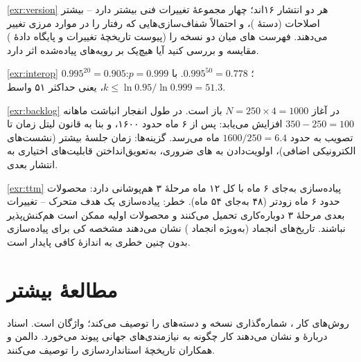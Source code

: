 \documentclass[11pt,a4paper]{article}
\begin{document}
\begin{solutionbox}{\ref{exr:version}}
هر دو انتشار ۱۶اند؛  چهار مجموعهٔ تغییرات فنی بیشتر دارد -- بیشتر اصلاحات (دستهٔ )، و احتمالاً شفاف‌سازی‌هایی
که رفتار را در موارد مرزی تغییر می‌دهند. فهرست های میان دو نسخه را (پیوست تاریخچهٔ تغییرات و پایگاه دادهٔ )
مقایسه و بررسی کنید آیا هیچ‌یک بر رویه‌های پیاده‌شده اثر دارد.
\end{solutionbox}

\begin{solutionbox}{\ref{exr:interop}}
$0.995^{20} = 0.905$؛ $0.995^{50} = 0.778$. با $p = 0.999$: $k \le \ln 0.95/\ln 0.999 = 51.3$، یعنی حداکثر ۵۱ واسط.
\end{solutionbox}

\begin{solutionbox}{\ref{exr:backlog}}
در آغاز $N = 250\times4 = 1000$  باز است. در طول انفجار انباشت ماهانه $350 - 250 = 100$ افزایش می‌یابد: پس از ۶ ماه
حدود ۱۶۰۰، و بنا به قانون لیتل زمان تا تصویب به حدود $1600/250 = 6.4$ ماه می‌رسد. گزینه‌ها: زمان جلسهٔ بیشتر (نشست‌های
الکترونیکی اضافی)، اولویت‌دادن به های ضروری، به‌تعویق‌انداختن قابلیت‌های اختیاری به انتشار بعدی.
\end{solutionbox}

\begin{solutionbox}{\ref{exr:ttm}}
پیاده‌سازی به‌جای ۶ ماه با کل ۱۲ ماه مرحلهٔ ۳ هم‌پوشانی دارد: محصولات حدود ۶ ماه زودتر (۴۸ به‌جای ۵۴ ماه). خطر: پیاده‌سازی
یک هدف متحرک -- تغییرات بعدی مرحلهٔ ۳ دوباره‌کاری تحمیل می‌کنند و محصولات اولیه ممکن است هم‌کنش‌پذیر نباشند. تاریخ‌های
انجماد (به‌ویژه انجماد ) نشان می‌دهند مشخصه کی برای پیاده‌سازی بدون چنین خطری به اندازهٔ کافی پایدار است.
\end{solutionbox}

\section{مطالعهٔ بیشتر}
 \cite{tr21900} روش‌های کار ، شماره‌گذاری نسخه و دسته‌های  را توصیف می‌کند؛ 
\cite{tr21905} واژگان است. اسناد  دربارهٔ  و  \cite{itu2015m2083,itu2017m2410,itu2023m2160}
نشان می‌دهند کار  چگونه به نیازمندی‌های جهانی پیوند می‌خورد. دالمن و همکاران \cite{dahlman2020nr} تاریخچهٔ
استانداردسازی  را توصیف می‌کنند.

\begin{latin}
\printbibliography[heading=subbibliography,title={References}]
\end{latin}
\end{document}
